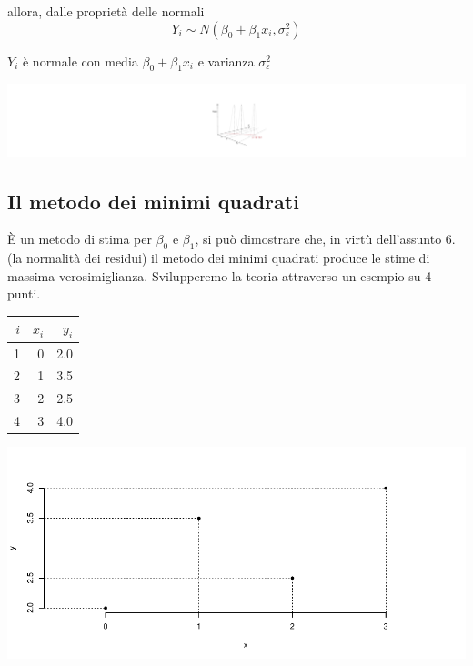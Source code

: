 \documentclass[
  11pt,
]{book}
\theoremstyle{mytheoremstyle}
\theoremstyle{mydefstyle}
\begin{document}
allora, dalle proprietà delle normali
\[Y_i\sim  N\left(\beta_0+\beta_1x_i,\sigma_\varepsilon^2\right)\]

\(Y_i\) è normale con media \(\beta_0+\beta_1x_i\) e varianza \(\sigma_\varepsilon^2\)

\begin{center}\includegraphics{Appunti_di_Statistica_2025_files/figure-latex/17-regressione-I-28-1} \end{center}

\subsection{Il metodo dei minimi quadrati}\label{il-metodo-dei-minimi-quadrati}

È un metodo di stima per \(\beta_0\) e \(\beta_1\), si può dimostrare che, in virtù
dell'assunto 6. (la normalità dei residui) il metodo dei minimi quadrati produce le
stime di massima verosimiglianza. Svilupperemo la teoria attraverso un esempio su 4 punti.

\begin{tabular}{rrr}
\toprule
$i$ & $x_i$ & $y_i$\\
\midrule
1 & 0 & 2.0\\
2 & 1 & 3.5\\
3 & 2 & 2.5\\
4 & 3 & 4.0\\
\bottomrule
\end{tabular}

\begin{center}\includegraphics{Appunti_di_Statistica_2025_files/figure-latex/17-regressione-I-30-1} \end{center}
\end{document}
